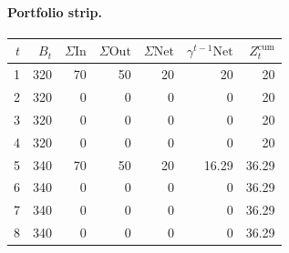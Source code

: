 \documentclass[12pt, a4paper]{article}
\begin{document}
\paragraph{Portfolio strip.}
\begin{center}
\begin{tabular}{rrrrrrr}
\toprule
$t$ & $B_t$ & $\Sigma\mathrm{In}$ & $\Sigma\mathrm{Out}$ & $\Sigma\mathrm{Net}$ & $\gamma^{t-1}\mathrm{Net}$ & $Z_t^{\mathrm{cum}}$\\
\midrule
1 & 320 & 70 & 50 & 20 & 20 & 20 \\
2 & 320 & 0 & 0 & 0 & 0 & 20 \\
3 & 320 & 0 & 0 & 0 & 0 & 20 \\
4 & 320 & 0 & 0 & 0 & 0 & 20 \\
5 & 340 & 70 & 50 & 20 & 16.29 & 36.29 \\
6 & 340 & 0 & 0 & 0 & 0 & 36.29 \\
7 & 340 & 0 & 0 & 0 & 0 & 36.29 \\
8 & 340 & 0 & 0 & 0 & 0 & 36.29 \\
\bottomrule
\end{tabular}
\end{center}
\end{document}
